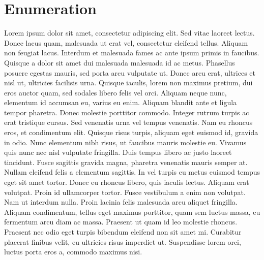 \section*{Enumeration}
Lorem ipsum dolor sit amet, consectetur adipiscing elit. Sed vitae laoreet lectus.
Donec lacus quam, malesuada ut erat vel, consectetur eleifend tellus. Aliquam non
feugiat lacus. Interdum et malesuada fames ac ante ipsum primis in faucibus.
Quisque a dolor sit amet dui malesuada malesuada id ac metus. Phasellus posuere
egestas mauris, sed porta arcu vulputate ut. Donec arcu erat, ultrices et nisl ut,
ultricies facilisis urna. Quisque iaculis, lorem non maximus pretium, dui eros
auctor quam, sed sodales libero felis vel orci. Aliquam neque nunc, elementum id
accumsan eu, varius eu enim. Aliquam blandit ante et ligula tempor pharetra.
Donec molestie porttitor commodo. Integer rutrum turpis ac erat tristique cursus.
Sed venenatis urna vel tempus venenatis. Nam eu rhoncus eros, et condimentum elit.
Quisque risus turpis, aliquam eget euismod id, gravida in odio. Nunc elementum
nibh risus, ut faucibus mauris molestie eu.
Vivamus quis nunc nec nisl vulputate fringilla. Duis tempus libero ac justo
laoreet tincidunt. Fusce sagittis gravida magna, pharetra venenatis mauris
semper at. Nullam eleifend felis a elementum sagittis. In vel turpis eu metus
euismod tempus eget sit amet tortor. Donec eu rhoncus libero, quis iaculis lectus.
Aliquam erat volutpat. Proin id ullamcorper tortor. Fusce vestibulum a enim non
volutpat. Nam ut interdum nulla. Proin lacinia felis malesuada arcu aliquet fringilla.
Aliquam condimentum, tellus eget maximus porttitor, quam sem luctus massa,
eu fermentum arcu diam ac massa. Praesent ut quam id leo molestie rhoncus.
Praesent nec odio eget turpis bibendum eleifend non sit amet mi. Curabitur placerat
finibus velit, eu ultricies risus imperdiet ut. Suspendisse lorem orci, luctus
porta eros a, commodo maximus nisi.

